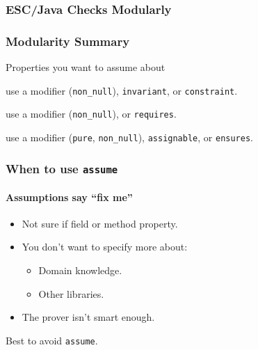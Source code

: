 \begin{frame}[fragile]
\frametitle{ESC/Java Checks Modularly}

\begin{example}

\end{example}
\end{frame}

\begin{frame}[fragile]
\frametitle{Modularity Summary}

Properties you want to assume about
\begin{description}
\item[Fields:]
use a modifier (\lstinline!non_null!),
\lstinline!invariant!, or \lstinline!constraint!.

\item[Method arguments:]
use a modifier (\lstinline!non_null!),
or \lstinline!requires!.

\item[Method results:]
use a modifier (\lstinline!pure!, \lstinline!non_null!),
\lstinline!assignable!, or \lstinline!ensures!.
\end{description}
\end{frame}

\begin{frame}[fragile]
\frametitle{When to use \lstinline!assume!}
\framesubtitle{Assumptions say ``fix me''}

\begin{itemize}
\item
Not sure if field or method property.

\item
You don't want to specify more about:
\begin{itemize}
\item
Domain knowledge.

\item
Other libraries.
\end{itemize}

\item
The prover isn't smart enough.
\end{itemize}

Best to avoid \lstinline!assume!.
\end{frame}

